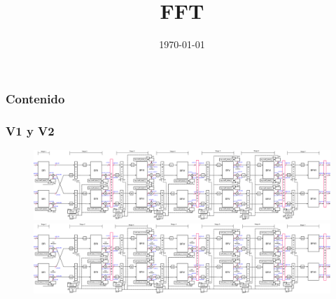 \documentclass[t]{beamer}
\title[FFT]{FFT }
\date{\today}
\begin{document}
\begin{frame}
\maketitle
\end{frame}

\section[Outline]{}
\begin{frame}
       \frametitle{Contenido}	
        \vspace*{0.5cm}
       \tiny{\tableofcontents}
\end{frame}




\begin{frame}
\frametitle{V1 y V2}	
\vspace*{0.5cm}
 \begin{figure}[ht]
    \centering
  \includegraphics[height=0.28\paperheight]{image/V1_esquema.eps} \\
\hfill
  \includegraphics[height=0.28\paperheight]{image/V2_esquema.eps}
    \end{figure}
\end{frame}
\end{document}
